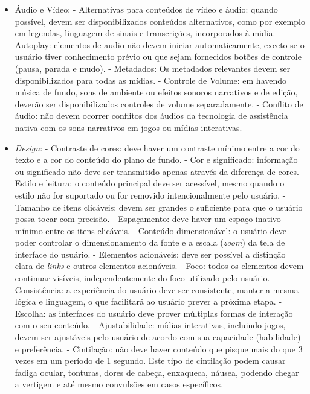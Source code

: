 \documentclass[
	12pt,				%
	oneside,			%
	a4paper,			%
	english,			%
	brazil				%
	]{abntex2ppgsi}
\begin{document}
\begin{itemize}
	\item Áudio e Vídeo:
		\subitem - Alternativas para conteúdos de vídeo e áudio: quando possível, devem ser disponibilizados conteúdos alternativos, como por exemplo em legendas, linguagem de sinais e transcrições, incorporados à midia.
		\subitem - Autoplay: elementos de audio não devem iniciar automaticamente, exceto se o usuário tiver conhecimento prévio ou que sejam fornecidos botões de controle (pausa, parada e mudo).
		\subitem - Metadados: Os metadados relevantes devem ser disponibilizados para todas as mídias.
		\subitem - Controle de Volume: em havendo música de fundo, sons de ambiente ou efeitos sonoros narrativos e de edição, deverão ser disponibilizados controles de volume separadamente.
		\subitem - Conflito de áudio: não devem ocorrer conflitos dos áudios da tecnologia de assistência nativa com os sons narrativos em jogos ou mídias interativas.
	\item \textit{Design}:
		\subitem - Contraste de cores: deve haver um contraste mínimo entre a cor do texto e a cor do conteúdo do plano de fundo.
		\subitem - Cor e significado: informação ou significado não deve ser transmitido apenas através da diferença de cores.
		\subitem - Estilo e leitura: o conteúdo principal deve ser acessível, mesmo quando o estilo não for suportado ou for removido intencionalmente pelo usuário.
		\subitem - Tamanho de itens clicáveis: devem ser grandes o suficiente para que o usuário possa tocar com precisão.
		\subitem - Espaçamento: deve haver um espaço inativo mínimo entre os itens clicáveis.
		\subitem - Conteúdo dimensionável: o usuário deve poder controlar o dimensionamento da fonte e a escala (\textit{zoom}) da tela de interface do usuário.
		\subitem - Elementos acionáveis: deve ser possível a distinção clara de \textit{links} e outros elementos acionáveis.
		\subitem - Foco: todos os elementos devem continuar visíveis, independentemente do foco utilizado pelo usuário.
		\subitem - Consistência: a experiência do usuário deve ser consistente, manter a mesma lógica e linguagem, o que facilitará ao usuário prever a próxima etapa.
		\subitem - Escolha: as interfaces do usuário deve prover múltiplas formas de interação com o seu conteúdo.
		\subitem - Ajustabilidade: mídias interativas, incluindo jogos, devem ser ajustáveis pelo usuário de acordo com sua capacidade (habilidade) e preferência.
		\subitem - Cintilação: não deve haver conteúdo que pisque mais do que 3 vezes em um período de 1 segundo. Este tipo de cintilação podem causar fadiga ocular, tonturas, dores de cabeça, enxaqueca, náusea, podendo chegar a vertigem e até mesmo convulsões em casos específicos.

\end{itemize}
\end{document}
